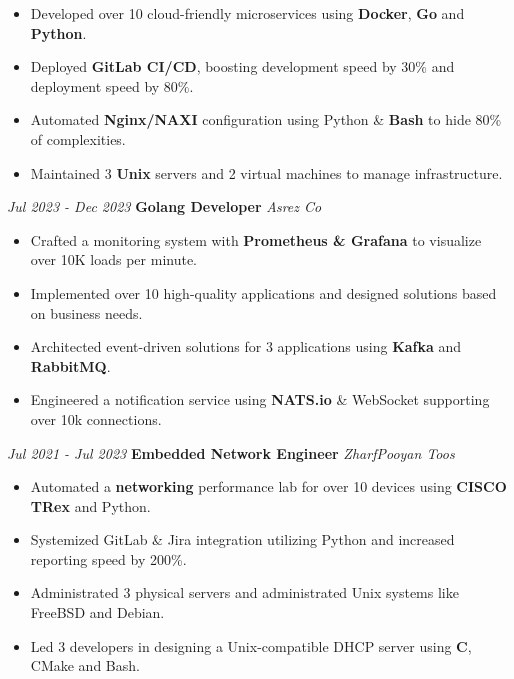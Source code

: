 \documentclass{engineercv}
\begin{document}
\begin{itemize}
  \item Developed over 10 cloud-friendly microservices using \textbf{Docker}, \textbf{Go} and \textbf{Python}.
  \item Deployed \textbf{GitLab CI/CD}, boosting development speed by 30\% and deployment speed by 80\%.
  \item Automated \textbf{Nginx/NAXI} configuration using Python \& \textbf{Bash} to hide 80\% of complexities.
  \item Maintained 3 \textbf{Unix} servers and 2 virtual machines to manage infrastructure.
\end{itemize}

\begin{twocolentry}{\textit{Jul 2023 - Dec 2023}}
  \textbf{Golang Developer}
  \textit{Asrez Co}
\end{twocolentry}

\begin{itemize}
  \item Crafted a monitoring system with \textbf{Prometheus \& Grafana} to visualize over 10K loads per minute.
  \item Implemented over 10 high-quality applications and designed solutions based on business needs.
  \item Architected event-driven solutions for 3 applications using \textbf{Kafka} and \textbf{RabbitMQ}.
  \item Engineered a notification service using \textbf{NATS.io} \& WebSocket supporting over 10k connections.
\end{itemize}

\begin{twocolentry}{\textit{Jul 2021 - Jul 2023}}
  \textbf{Embedded Network Engineer}
  \textit{ZharfPooyan Toos}
\end{twocolentry}

\begin{itemize}
  \item Automated a \textbf{networking} performance lab for over 10 devices using \textbf{CISCO TRex} and Python.
  \item Systemized GitLab \& Jira integration utilizing Python and increased reporting speed by 200\%.
  \item Administrated 3 physical servers and administrated Unix systems like FreeBSD and Debian.
  \item Led 3 developers in designing a Unix-compatible DHCP server using \textbf{C}, CMake and Bash.
\end{itemize}
\end{document}

